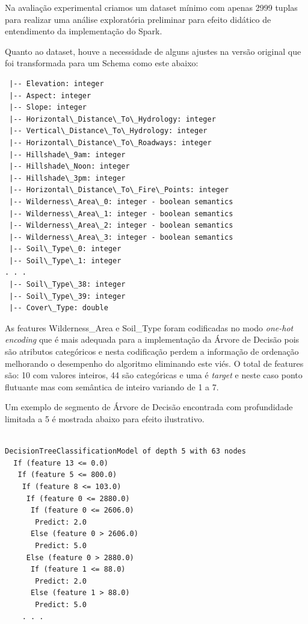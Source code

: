 \documentclass[12pt]{article}
\begin{document}
Na avaliação experimental criamos um dataset mínimo com apenas 2999 tuplas para realizar uma análise exploratória preliminar para efeito didático de entendimento da implementação do Spark.

Quanto ao dataset, houve a necessidade de alguns ajustes na versão original que foi transformada para um Schema como este abaixo:

\begin{verbatim}
 |-- Elevation: integer
 |-- Aspect: integer
 |-- Slope: integer
 |-- Horizontal\_Distance\_To\_Hydrology: integer
 |-- Vertical\_Distance\_To\_Hydrology: integer
 |-- Horizontal\_Distance\_To\_Roadways: integer
 |-- Hillshade\_9am: integer
 |-- Hillshade\_Noon: integer
 |-- Hillshade\_3pm: integer
 |-- Horizontal\_Distance\_To\_Fire\_Points: integer
 |-- Wilderness\_Area\_0: integer - boolean semantics
 |-- Wilderness\_Area\_1: integer - boolean semantics
 |-- Wilderness\_Area\_2: integer - boolean semantics
 |-- Wilderness\_Area\_3: integer - boolean semantics
 |-- Soil\_Type\_0: integer
 |-- Soil\_Type\_1: integer
. . . 
 |-- Soil\_Type\_38: integer
 |-- Soil\_Type\_39: integer
 |-- Cover\_Type: double
\end{verbatim}

As features Wilderness\_Area e Soil\_Type foram codificadas no modo \emph{one-hot encoding} que é mais adequada para a implementação da Árvore de Decisão pois são atributos categóricos e nesta codificação perdem a informação de ordenação melhorando o desempenho do algoritmo eliminando este viés. O total de features são: 10 com valores inteiros, 44 são categóricas e uma é \emph{target} e neste caso ponto flutuante mas com semântica de inteiro variando de 1 a 7.

Um exemplo de segmento de Árvore de Decisão encontrada com profundidade limitada a 5 é mostrada abaixo para efeito ilustrativo.

\begin{verbatim} 

DecisionTreeClassificationModel of depth 5 with 63 nodes
  If (feature 13 <= 0.0)
   If (feature 5 <= 800.0)
    If (feature 8 <= 103.0)
     If (feature 0 <= 2880.0)
      If (feature 0 <= 2606.0)
       Predict: 2.0
      Else (feature 0 > 2606.0)
       Predict: 5.0
     Else (feature 0 > 2880.0)
      If (feature 1 <= 88.0)
       Predict: 2.0
      Else (feature 1 > 88.0)
       Predict: 5.0
    . . .    
\end{verbatim} 

%
\end{document}
